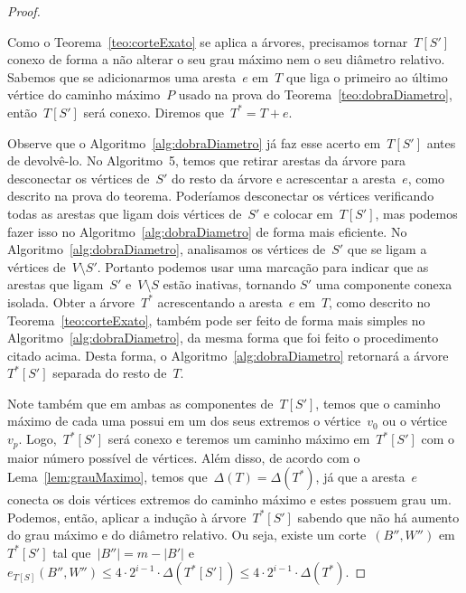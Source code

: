 \begin{proof}
\begin{center}
\begin{tikzpicture}
			\end{tikzpicture} \end{center}
			Como o Teorema~\ref{teo:corteExato} se aplica a 
			árvores, precisamos tornar~$T[S']$ conexo de forma a não 
			alterar o seu grau máximo nem o seu diâmetro relativo.
			Sabemos que se adicionarmos uma aresta~$e$ em~$T$ que 
			liga o primeiro ao último vértice do caminho máximo~$P$
			usado na prova do Teorema~\ref{teo:dobraDiametro},
			então~$T[S']$ será conexo. 
			Diremos que~${T^* = T+ e}$.

			Observe que o Algoritmo~\ref{alg:dobraDiametro} já faz
			esse acerto em~$T[S']$ antes de devolvê-lo.
			No Algoritmo~5, temos que 
			retirar arestas da árvore para 
			desconectar os vértices de~$S'$ do resto da árvore
			e acrescentar a aresta~$e$, como descrito na prova do teorema.
			Poderíamos desconectar os vértices verificando todas as arestas que 
			ligam dois vértices de~$S'$ e colocar em~$T[S']$, mas podemos
			fazer isso no Algoritmo~\ref{alg:dobraDiametro} de forma 
			mais eficiente. 
			No Algoritmo~\ref{alg:dobraDiametro},
			analisamos os vértices de~$S'$ que se ligam a vértices 
			de~$V\setminus S'$. 
			Portanto podemos usar uma marcação para indicar que as 
			arestas que ligam~$S'$ e~${V\setminus S}$ estão inativas, 
			tornando $S'$ uma componente conexa isolada. 
			Obter a árvore~$T^*$ acrescentando a aresta~$e$ em~$T$, como descrito no
			Teorema~\ref{teo:corteExato}, também pode ser feito de 
			forma mais simples no Algoritmo~\ref{alg:dobraDiametro},
			da mesma forma que foi feito o procedimento citado acima.
			Desta forma, o Algoritmo~\ref{alg:dobraDiametro} retornará
			a árvore~$T^*[S']$ separada do resto de~$T$.

			Note também que em ambas as componentes de~$T[S']$, 
			temos que o caminho máximo de cada uma possui em um dos
			seus extremos o vértice~$v_0$ ou o vértice~$v_p$.
			Logo,~$T^*[S']$ será conexo e 
			teremos um caminho máximo 
			em~$T^*[S']$ com o maior número possível de vértices.
			Além disso, de acordo com o Lema~\ref{lem:grauMaximo}, 
			temos que~${\Delta(T) = \Delta(T^*)}$, já que a aresta~$e$ 
			conecta os dois vértices extremos do caminho máximo
			e estes possuem grau um.
			Podemos, então, aplicar a indução à árvore~$T^*[S']$ 
			sabendo que não há aumento
			do grau máximo e do diâmetro relativo.
			Ou seja,
			existe um corte~$(B'',W'')$ em~$T^*[S']$
			tal que~${|B''|=m-|B'|}$ 
			e~${e_{T[S]}(B'',W'')\le 4\cdot 2^{i-1}\cdot
			\Delta(T^*[S'])\le 4\cdot 2^{i-1}\cdot\Delta(T^*)}$.


\end{proof}
